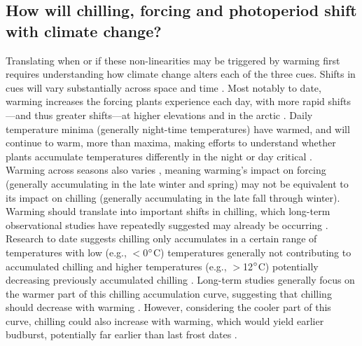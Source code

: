 \documentclass[11pt,letter]{article}
\begin{document}
\subsection{How will chilling, forcing and photoperiod shift with climate change?}
Translating when or if these non-linearities may be triggered by warming first requires understanding how climate change alters each of the three cues. Shifts in cues will vary substantially across space and time \citep{Burrows2011pace}. Most notably to date, warming increases the forcing plants experience each day, with more rapid shifts---and thus greater shifts---at higher elevations and in the arctic \citep{IPCC:2014sm}. Daily temperature minima (generally night-time temperatures) have warmed, and will continue to warm, more than maxima, making efforts to understand whether plants accumulate temperatures differently in the night or day critical \citep{prasad2008,shen2018}. \\ 

Warming across seasons also varies \citep{Alexander:2006qy}, meaning warming's impact on forcing (generally accumulating in the late winter and spring) may not be equivalent to its impact on chilling (generally accumulating in the late fall through winter). Warming should translate into important shifts in chilling, which long-term observational studies have repeatedly suggested may already be occurring \citep{fu2015,piao2017}.  \\

Research to date suggests chilling only accumulates in a certain range of temperatures with low (e.g., $<$0$\degree$C) temperatures generally not contributing to accumulated chilling and higher temperatures (e.g., $>$12$\degree$C) potentially decreasing previously accumulated chilling \citep[see Fig. \ref{fig:chilling} and][]{richardson1974,fishman1987}. Long-term studies generally focus on the warmer part of this chilling accumulation curve, suggesting that chilling should decrease with warming \citep{fu2015,piao2017,gauzere2019}.  However, considering the cooler part of this curve, chilling could also increase with warming, which would yield earlier budburst, potentially far earlier than last frost dates \citep[][]{guy2014}. \\
\end{document}
